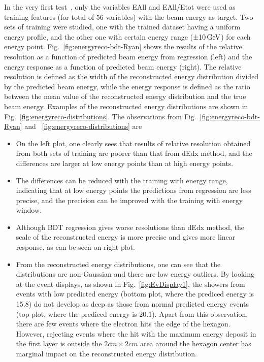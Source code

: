 In the very first test~\cite{Ryan-ERecoBDT}, only the variables EAll and EAll/Etot were used as training features (for total of 56 variables) with the beam energy as target. Two sets of training were studied, one with the trained dataset having a uniform energy profile, and the other one with certain energy range ($\pm 10\,\text{Ge\hspace{-.08em}V}$) for each energy point. Fig.~\ref{fig:energyreco-bdt-Ryan} shows the results of the relative resolution as a function of predicted beam energy from regression (left) and the energy response as a function of predicted beam energy (right). 
The relative resolution is defined as the width of the reconstructed energy distribution divided by the predicted beam energy, while the energy response is defined as the ratio between the mean value of the reconstructed energy distribution and the true beam energy. Examples of the reconstructed energy distributions are shown in Fig.~\ref{fig:energyreco-distributions}. 
The observations from Fig.~\ref{fig:energyreco-bdt-Ryan} and ~\ref{fig:energyreco-distributions} are
\begin{itemize}  
\item On the left plot, one clearly sees that results of relative resolution obtained from both sets of training are poorer than that from dEdx method, and the differences are larger at low energy points than at high energy points.
\item The differences can be reduced with the training with energy range, indicating that at low energy points the predictions from regression are less precise, and the precision can be improved with the training with energy window.  
\item Although BDT regression gives worse resolutions than dEdx method, the scale of the reconstructed energy is more precise and gives more linear response, as can be seen on right plot.  
\item From the reconstructed energy distributions, one can see that the distributions are non-Gaussian and there are low energy outliers. By looking at the event displays, as shown in Fig.~\ref{fig:EvDisplay1}, the showers from events with low predicted energy (bottom plot, where the prediced energy is 15.8\GeV) do not develop as deep as those from normal predicted energy events (top plot, where the prediced energy is 20.1\GeV). Apart from this observation, there are few events where the electron hits the edge of the hexagon. However, rejecting events where the hit with the maximum energy deposit in the first layer is outside the $2\unit{cm}\times 2\unit{cm}$ area around the hexagon center has marginal impact on the reconstructed energy distribution.
\end{itemize}

